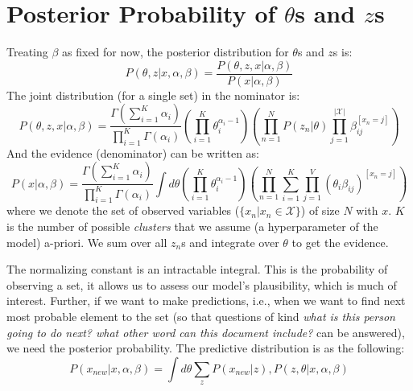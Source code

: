 \documentclass{article}%
\begin{document}
\section{Posterior Probability of  $\theta$s and $z$s}
Treating $\beta$ as fixed for now, the posterior distribution for $\theta$s and $z$s is:
\begin{equation*}
P(\theta, z|x, \alpha, \beta) = \frac{P(\theta, z, x|\alpha, \beta)}{P(x|\alpha, \beta)}
\end{equation*}
The joint distribution (for a single set) in the nominator is:
\begin{equation*}
P(\theta, z, x|\alpha, \beta) = \frac{\Gamma(\sum_{i=1}^K \alpha_i)}{\prod_{i=1}^K\Gamma(\alpha_i)} \left(\prod_{i=1}^K \theta_i^{\alpha_i -1} \right) \left(\prod_{n=1}^N P(z_n|\theta)\prod_{j=1}^{|
\mathcal{X}|}\beta_{ij}^{[x_n = j]}\right)
\end{equation*}
And the evidence (denominator) can be written as:
\begin{equation*}
P(x|\alpha, \beta) = \frac{\Gamma(\sum_{i=1}^K \alpha_i)}{\prod_{i=1}^K\Gamma(\alpha_i)} \int d\theta \left(\prod_{i=1}^K \theta_i^{\alpha_i -1} \right) \left(\prod_{n=1}^N\sum_{i=1}^K\prod_{j=1}^V(\theta_i\beta_{ij})^{[x_n = j]}\right)
\end{equation*}
where we denote the set of observed variables ($\{x_n| x_n\in \mathcal{X}\}$) of size $N$ with $x$. $K$ is the number of possible \textit{clusters} that we assume (a hyperparameter of the model) a-priori. We sum over all $z_n$s and integrate over $\theta$ to get the evidence.

The normalizing constant is an intractable integral. This is the probability of observing a set, it allows us to assess our model's plausibility, which is much of interest. Further, if we want to make predictions, i.e., when we want to find next most probable element to the set (so that questions of kind \textit{what is this person going to do next? what other word can this document include?} can be answered), we need the posterior probability. The predictive distribution is as the following:
\begin{equation*}
P(x_{new}|x, \alpha, \beta) = \int d\theta \sum_z P(x_{new}|z), P(z, \theta|x, \alpha, \beta)
\end{equation*}
\end{document}
